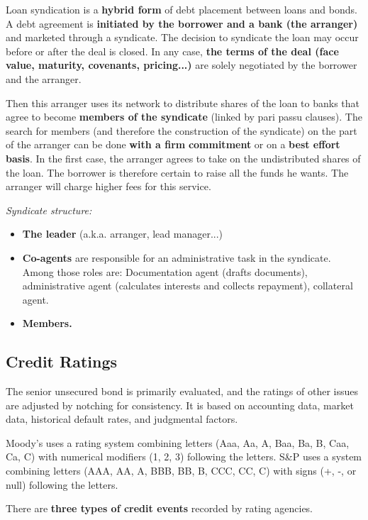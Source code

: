 \documentclass[12pt,a4paper]{article}
\begin{document}
Loan syndication is a \textbf{hybrid form} of debt placement between loans and bonds. A debt agreement is \textbf{initiated by the borrower and a bank (the arranger)} and marketed through a syndicate. The decision to syndicate the loan may occur before or after the deal is closed. In any case, \textbf{the terms of the deal (face value, maturity, covenants, pricing...)} are solely negotiated by the borrower and the arranger.

Then this arranger uses its network to distribute shares of the loan to banks that agree to become \textbf{members of the syndicate} (linked by pari passu clauses). The search for members (and therefore the construction of the syndicate) on the part of the arranger can be done \textbf{with a firm} \textbf{commitment} or on a \textbf{best effort basis}. In the first case, the arranger agrees to take on the undistributed shares of the loan. The borrower is therefore certain to raise all the funds he wants. The arranger will charge higher fees for this service.

\textit{Syndicate structure:}

\begin{itemize}
\item \textbf{The leader} (a.k.a. arranger, lead manager...)
\item \textbf{Co-agents} are responsible for an administrative task in the syndicate. Among those roles are: Documentation agent (drafts documents), administrative agent (calculates interests and collects repayment), collateral agent.
\item \textbf{Members.}
\end{itemize}






\subsection{Credit Ratings}
The senior unsecured bond is primarily evaluated, and the ratings of other issues are 
adjusted by notching for consistency. It is  based on accounting data, market data, historical default rates, and judgmental factors.

Moody's uses a rating system combining letters (Aaa, Aa, A, Baa, Ba, B, Caa, Ca, C) with numerical modifiers (1, 2, 3) following the letters. S\&P uses a system combining letters (AAA, AA, A, BBB, BB, B, CCC, CC, C) with signs (+, -, or null) following the letters.


There are \textbf{three types of credit events} recorded by rating agencies.
\end{document}
